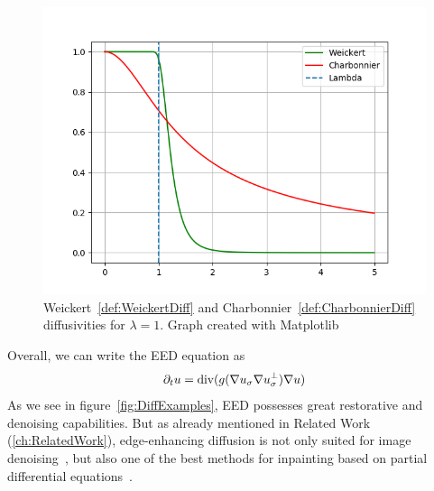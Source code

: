\begin{figure}[H]
    \centering
    \includegraphics[width=\linewidth]{../Images/diffusivities.png}
    \caption{Weickert~\eqref{def:WeickertDiff} and Charbonnier~\eqref{def:CharbonnierDiff}
    diffusivities for $\lambda = 1$. Graph created with Matplotlib~\cite{matplotlib}}
\end{figure}
Overall, we can write the EED equation as
\begin{equation}
    \partial_t u = \operatorname{div}(g(\mathbf{\nabla} u_\sigma\mathbf{\nabla} u_\sigma^\bot)\mathbf{\nabla} u)\label{def:EED}
\end{equation}
As we see in figure~\ref{fig:DiffExamples}, EED possesses great restorative and denoising
capabilities. But as already mentioned in Related Work (\ref{ch:RelatedWork}), edge-enhancing
diffusion is not
only suited for image denoising~\cite{galic05, weickert96}, but also one of the best methods for inpainting based on partial
differential equations~\cite{schmaltz09, galic08, schmaltz14}.

